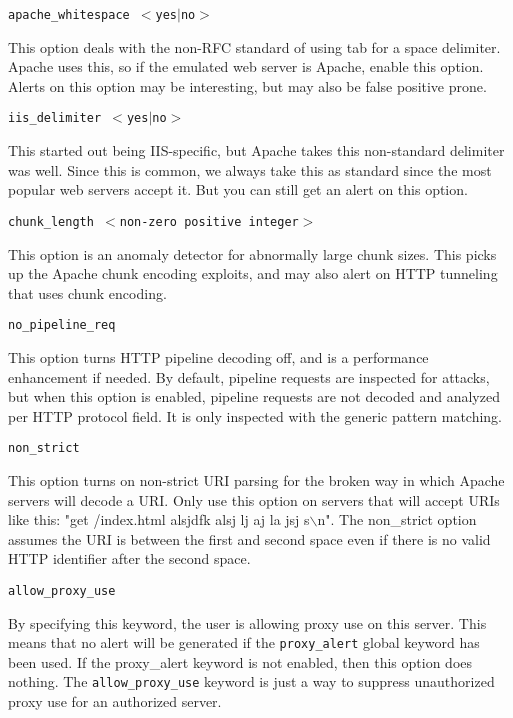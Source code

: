 \documentclass[english]{report}
\newcounter{slistnum}
\newenvironment{slist}
{ \begin{list}{ {\bf \arabic{slistnum}.} }{\usecounter{slistnum} } }
{ \end{list} }
\begin{document}
\begin{slist}
\item \texttt{apache\_whitespace $<$yes$|$no$>$}

This option deals with the non-RFC standard of using tab for a space delimiter.
Apache uses this, so if the emulated web server is Apache, enable this option.
Alerts on this option may be interesting, but may also be false positive prone.

\item \texttt{iis\_delimiter $<$yes$|$no$>$}

This started out being IIS-specific, but Apache takes this non-standard
delimiter was well.  Since this is common, we always take this as standard
since the most popular web servers accept it.  But you can still get an alert
on this option.

\item \texttt{chunk\_length $<$non-zero positive integer$>$}

This option is an anomaly detector for abnormally large chunk sizes.  This
picks up the Apache chunk encoding exploits, and may also alert on HTTP
tunneling that uses chunk encoding.

\item \texttt{no\_pipeline\_req}

This option turns HTTP pipeline decoding off, and is a performance enhancement
if needed.  By default, pipeline requests are inspected for attacks, but when
this option is enabled, pipeline requests are not decoded and analyzed per HTTP
protocol field.  It is only inspected with the generic pattern matching.

\item \texttt{non\_strict}

This option turns on non-strict URI parsing for the broken way in which Apache
servers will decode a URI.  Only use this option on servers that will accept
URIs like this: "get /index.html alsjdfk alsj lj aj  la jsj s$\backslash$n".
The non\_strict option assumes the URI is between the first and second space
even if there is no valid HTTP identifier after the second space.

\item \texttt{allow\_proxy\_use}

By specifying this keyword, the user is allowing proxy use on this server.
This means that no alert will be generated if the \texttt{proxy\_alert} global
keyword has been used.  If the proxy\_alert keyword is not enabled, then this
option does nothing.  The \texttt{allow\_proxy\_use} keyword is just a way to
suppress unauthorized proxy use for an authorized server.  


\end{slist}
\end{document}
